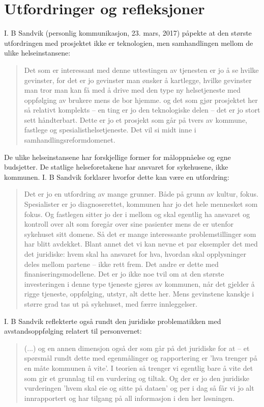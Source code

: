 \section{Utfordringer og refleksjoner}
I. B Sandvik (personlig kommunikasjon, 23. mars, 2017) påpekte at den største utfordringen med prosjektet ikke er teknologien, men samhandlingen mellom de ulike
helseinstansene:

\blockquote{Det som er interessant med denne uttestingen av tjenesten er jo å se hvilke gevinster, for det er jo gevinster man ønsker å kartlegge, hvilke gevinster man tror
    man kan få med å drive med den type ny helsetjeneste med oppfølging av brukere mens de bor hjemme. og det som gjør prosjektet her så relativt komplekts -- en ting
    er jo den teknologiske delen -- det er jo stort sett håndterbart. Dette er jo et prosjekt som går på tvers av kommune, fastlege og spesialisthelsetjeneste. Det vil
si midt inne i samhandlingsreformdomenet.}

De ulike helseinstansene har forskjellige former for måloppnåelse og egne budsjetter. De statlige helseforetakene har ansvaret for sykehusene,
ikke kommunen. I. B Sandvik forklarer hvorfor dette kan være en utfordring:

\blockquote{Det er jo en utfordring av mange grunner. Både på grunn av kultur, fokus. Spesialister er jo diagnoserettet, kommunen har jo det hele mennesket som fokus. Og
    fastlegen sitter jo der i mellom og skal egentlig ha ansvaret og kontroll over alt som foregår over sine pasienter mens de er utenfor sykehuset sitt domene. Så det er
    mange interessante problemstillinger som har blitt avdekket. Blant annet det vi kan nevne et par eksempler det med det juridiske: hvem skal ha ansvaret for hva,
    hvordan skal opplysninger deles mellom partene -- ikke rett frem. Det andre er dette med finaniseringsmodellene. Det er jo ikke noe tvil om at den største investeringen
    i denne type tjeneste gjøres av kommunen, når det gjelder å rigge tjeneste, oppfølging, utstyr, alt dette her. Mens gevinstene kanskje i større
grad tas ut på sykehuset, med færre innleggelser.}

I. B Sandvik reflekterte også rundt den juridiske problematikken med avstandsoppfølging relatert til personvernet:
\blockquote{(...) og en annen dimensjon også der som går på det juridiske for at -- et spørsmål rundt dette med egenmålinger og rapportering er
'hva trenger på en måte kommunen å vite'. I teorien så trenger vi egentlig bare å vite det som gir et grunnlag til en vurdering og tiltak.
Og der er jo den juridiske vurderingen 'hvem skal eie og sitte på dataen' og per i dag så får vi jo alt innrapportert og har tilgang på
all informasjon i den her løsningen.}

